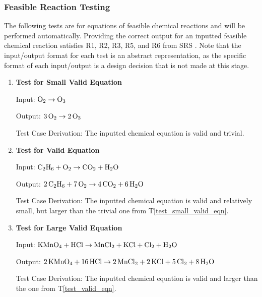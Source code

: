 \documentclass[12pt, titlepage]{article}
\newcounter{testnum} %
\newcommand{\testref}[1]{T\ref{#1}}
\begin{document}
\subsubsection{Feasible Reaction Testing}

The following tests are for equations of feasible chemical reactions and
will be performed automatically. Providing the correct output for an inputted
feasible chemical reaction satisfies R1, R2, R3, R5, and R6 from SRS . Note that the input/output format
for each test is an abstract representation, as the specific format of each
input/output is a design decision that is not made at this stage.

\begin{enumerate}

  \item[T\refstepcounter{testnum}\thetestnum \label{test_small_valid_eqn}:]
    \textbf{Test for Small Valid Equation}

    Input: $\ce{O2} \rightarrow \ce{O3}$ \cite{fahey_twenty_2011}

    Output: $\ce{3O2} \rightarrow \ce{2O3}$ \cite[p.~6]{fahey_twenty_2011}

    Test Case Derivation: The inputted chemical equation is
    valid and trivial.

  \item[T\refstepcounter{testnum}\thetestnum \label{test_valid_eqn}:]
    \textbf{Test for Valid Equation}

    Input: $\ce{C2H6} + \ce{O2} \rightarrow \ce{CO2} + \ce{H2O}$
    \cite{hamid_balancing_2019}

    Output: $\ce{2C2H6} + \ce{7O2} \rightarrow \ce{4CO2} + \ce{6H2O}$
    \cite[p.~523]{hamid_balancing_2019}

    Test Case Derivation: The inputted chemical equation is valid and
    relatively small, but larger than the trivial one from
    \testref{test_small_valid_eqn}.

  \item[T\refstepcounter{testnum}\thetestnum \label{test_large_valid_eqn}:]
    \textbf{Test for Large Valid Equation}

    Input: $\ce{KMnO4} + \ce{HCl} \rightarrow \ce{MnCl2} + \ce{KCl} +
      \ce{Cl2} + \ce{H2O}$ \cite{taylor_balancing_2021}

    Output: $\ce{2KMnO4} + \ce{16HCl} \rightarrow \ce{2MnCl2} + \ce{2KCl} +
      \ce{5Cl2} + \ce{8H2O}$ \cite{taylor_balancing_2021}

    Test Case Derivation: The inputted chemical equation is
    valid and larger than the one from \testref{test_valid_eqn}.


\end{enumerate}
\end{document}
